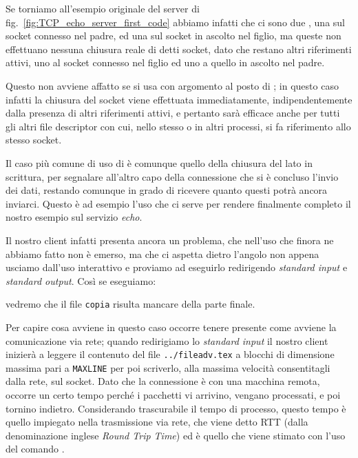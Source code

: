 Se torniamo all'esempio originale del server di
fig.~\ref{fig:TCP_echo_server_first_code} abbiamo infatti che ci sono due
, una sul socket connesso nel padre, ed una sul socket in ascolto
nel figlio, ma queste non effettuano nessuna chiusura reale di detti socket,
dato che restano altri riferimenti attivi, uno al socket connesso nel figlio
ed uno a quello in ascolto nel padre.

Questo non avviene affatto se si usa  con argomento
 al posto di ; in questo caso infatti la
chiusura del socket viene effettuata immediatamente, indipendentemente dalla
presenza di altri riferimenti attivi, e pertanto sarà efficace anche per tutti
gli altri file descriptor con cui, nello stesso o in altri processi, si fa
riferimento allo stesso socket.

Il caso più comune di uso di  è comunque quello della chiusura
del lato in scrittura, per segnalare all'altro capo della connessione che si è
concluso l'invio dei dati, restando comunque in grado di ricevere quanto
questi potrà ancora inviarci. Questo è ad esempio l'uso che ci serve per
rendere finalmente completo il nostro esempio sul servizio \textit{echo}. 

Il nostro client infatti presenta ancora un problema, che nell'uso che finora
ne abbiamo fatto non è emerso, ma che ci aspetta dietro l'angolo non appena
usciamo dall'uso interattivo e proviamo ad eseguirlo redirigendo
\textit{standard input} e \textit{standard output}. Così se eseguiamo:
vedremo che il file \texttt{copia} risulta mancare della parte finale.

Per capire cosa avviene in questo caso occorre tenere presente come avviene la
comunicazione via rete; quando redirigiamo lo \textit{standard input} il
nostro client inizierà a leggere il contenuto del file \texttt{../fileadv.tex}
a blocchi di dimensione massima pari a \texttt{MAXLINE} per poi scriverlo,
alla massima velocità consentitagli dalla rete, sul socket. Dato che la
connessione è con una macchina remota, occorre un certo tempo perché i
pacchetti vi arrivino, vengano processati, e poi tornino
indietro. Considerando trascurabile il tempo di processo, questo tempo è
quello impiegato nella trasmissione via rete, che viene detto RTT (dalla
denominazione inglese  \textit{Round Trip
  Time}) ed è quello che viene stimato con l'uso del comando .

